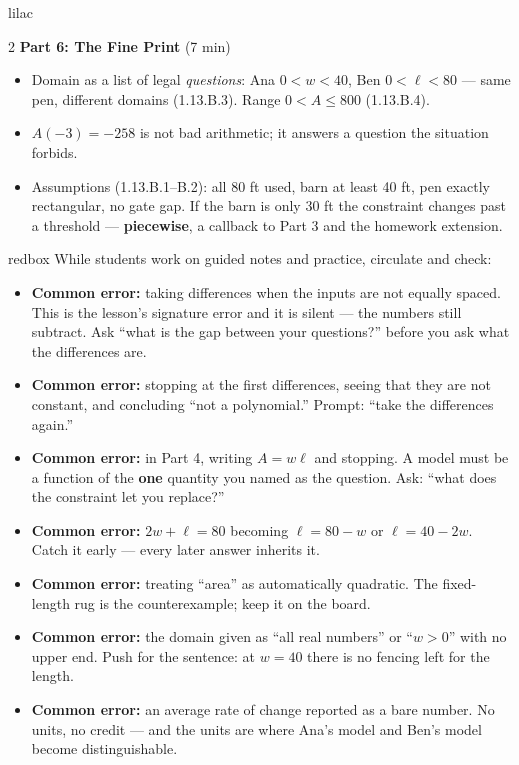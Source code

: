 \documentclass[10pt]{article}
\begin{document}
\begin{skillbox}[Lesson]{lilac}
\begin{multicols}{2}
\textbf{Part 6: The Fine Print} (7 min)

\begin{itemize}
  \item Domain as a list of legal \textit{questions}: Ana $0 < w < 40$, Ben
        $0 < \ell < 80$ --- same pen, different domains (1.13.B.3). Range
        $0 < A \le 800$ (1.13.B.4).
  \item $A(-3) = -258$ is not bad arithmetic; it answers a question the
        situation forbids.
  \item Assumptions (1.13.B.1--B.2): all 80 ft used, barn at least 40 ft, pen
        exactly rectangular, no gate gap. If the barn is only 30 ft the
        constraint changes past a threshold --- \textbf{piecewise}, a callback
        to Part 3 and the homework extension.
\end{itemize}
\end{multicols}
\end{skillbox}

\begin{skillbox}{redbox}
While students work on guided notes and practice, circulate and check:
\begin{itemize}
  \item \textbf{Common error:} taking differences when the inputs are not
        equally spaced. This is the lesson's signature error and it is silent
        --- the numbers still subtract. Ask ``what is the gap between your
        questions?'' before you ask what the differences are.
  \item \textbf{Common error:} stopping at the first differences, seeing that
        they are not constant, and concluding ``not a polynomial.'' Prompt:
        ``take the differences again.''
  \item \textbf{Common error:} in Part 4, writing $A = w\ell$ and stopping. A
        model must be a function of the \textbf{one} quantity you named as the
        question. Ask: ``what does the constraint let you replace?''
  \item \textbf{Common error:} $2w + \ell = 80$ becoming $\ell = 80 - w$ or
        $\ell = 40 - 2w$. Catch it early --- every later answer inherits it.
  \item \textbf{Common error:} treating ``area'' as automatically quadratic.
        The fixed-length rug is the counterexample; keep it on the board.
  \item \textbf{Common error:} the domain given as ``all real numbers'' or
        ``$w > 0$'' with no upper end. Push for the sentence: at $w = 40$ there
        is no fencing left for the length.
  \item \textbf{Common error:} an average rate of change reported as a bare
        number. No units, no credit --- and the units are where Ana's model and
        Ben's model become distinguishable.
\end{itemize}
\end{skillbox}
\end{document}

